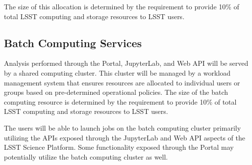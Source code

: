 The size of this allocation is determined by the \SRD requirement to provide 10\% of total LSST computing and storage resources to LSST users.

\subsection{Batch Computing Services}

Analysis performed through the Portal, JupyterLab, and Web API will be served by a shared computing cluster. This cluster will be managed by a workload management system that ensures resources are allocated to individual users or groups based on pre-determined operational policies. The size of the batch computing resource is determined by the \SRD requirement to provide 10\% of total LSST computing and storage resources to LSST users.

The users will be able to launch jobs on the batch computing cluster primarily utilizing the APIs exposed through the JupyterLab and Web API aspects of the LSST Science Platform. Some functionality exposed through the Portal may potentially utilize the batch computing cluster as well.

%
%
%
%
